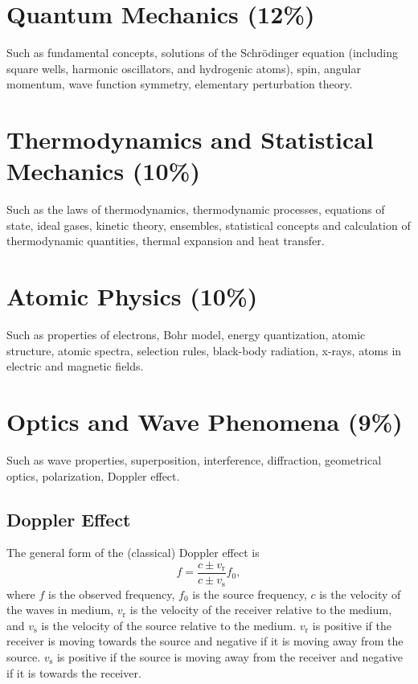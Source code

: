\documentclass[%
 reprint,
superscriptaddress,
 amsmath,amssymb,
 aps,
prc,
]{revtex4-1}
\begin{document}
\section{Quantum Mechanics (12\%)}
Such as fundamental concepts, solutions of the Schrödinger equation (including square wells, harmonic oscillators, and hydrogenic atoms), spin, angular momentum, wave function symmetry, elementary perturbation theory.

\section{Thermodynamics and Statistical Mechanics (10\%)}
Such as the laws of thermodynamics, thermodynamic processes, equations of state, ideal gases, kinetic theory, ensembles, statistical concepts and calculation of thermodynamic quantities, thermal expansion and heat transfer.

\section{Atomic Physics (10\%)}
Such as properties of electrons, Bohr model, energy quantization, atomic structure, atomic spectra, selection rules, black-body radiation, x-rays, atoms in electric and magnetic fields.

\section{Optics and Wave Phenomena (9\%)}
Such as wave properties, superposition, interference, diffraction, geometrical optics, polarization, Doppler effect.

\subsection{Doppler Effect}
The general form of the (classical) Doppler effect is
\begin{equation}
	f=\frac{c \pm v_\text{r}}{c \pm v_\text{s}} f_0,
\end{equation}
where $f$ is the observed frequency, $f_0$ is the source frequency, $c$ is the velocity of the waves in medium, $v_\text{r}$ is the velocity of the receiver relative to the medium, and $v_\text{s}$ is the velocity of the source relative to the medium. $v_\text{r}$ is positive if the receiver is moving towards the source and negative if it is moving away from the source. $v_\text{s}$ is positive if the source is moving away from the receiver and negative if it is towards the receiver.
\end{document}
